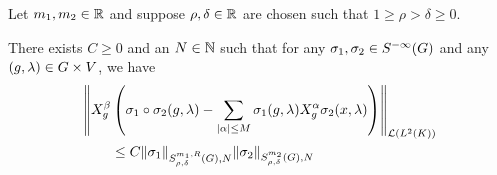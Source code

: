\begin{lemma}
    Let $m_1, m_2 \in \mathbb{R}$ and suppose $\rho, \delta \in \mathbb{R}$ are chosen such that $1 \geq \rho > \delta \geq 0$.

    There exists $C \geq 0$ and an $N \in \mathbb{N}$ such that
    for any $\sigma_1, \sigma_2 \in {S^{-\infty} (G)}$ and any $(g, \lambda) \in G \times V$,
    we have
    \begin{align*}
        &\norm [\Lin {\Lebesgue 2 \CompactGroup}] {%
            \LeftDifferentialOperator [g]  \beta \left(
                \sigma_1 \circ \sigma_2(g, \lambda)
                - \sum_{\abs \alpha \leq M} \sigma_1(g, \lambda) \LeftDifferentialOperator [g] \alpha \sigma_2(x, \lambda)
            \right)
        }\\
        &\qquad \leq C \SymbolSemiNorm {m_1, R} {\rho, \delta} N {\sigma_1} \SymbolSemiNorm {m_2} {\rho, \delta} N {\sigma_2}
    \end{align*}
\end{lemma}
